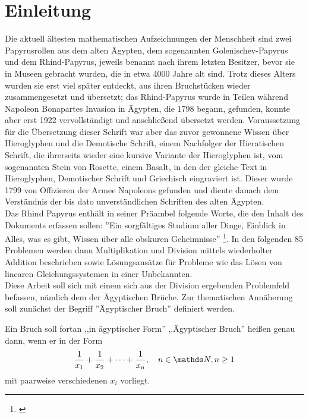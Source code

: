 \section{Einleitung}\label{sec:arithmetic}
Die aktuell ältesten mathematischen Aufzeichnungen der Menschheit sind zwei Papyrusrollen aus dem alten Ägypten, dem sogenannten Golenischev-Papyrus und dem Rhind-Papyrus, jeweils benannt nach ihrem letzten Besitzer, bevor sie in Museen gebracht wurden, die in etwa 4000 Jahre alt sind. Trotz dieses Alters wurden sie erst viel später entdeckt, aus ihren Bruchstücken wieder zusammengesetzt und übersetzt; das Rhind-Papyrus wurde in Teilen während Napoleon Bonapartes Invasion in Ägypten, die 1798 begann, gefunden, konnte aber erst 1922 vervollständigt und anschließend übersetzt werden. Voraussetzung für die Übersetzung dieser Schrift war aber das zuvor gewonnene Wissen über Hieroglyphen und die Demotische Schrift, einem Nachfolger der Hieratischen Schrift, die ihrerseits wieder eine kursive Variante der Hieroglyphen ist, vom sogenannten Stein von Rosette, einem Basalt, in den der gleiche Text in Hieroglyphen, Demotischer Schrift und Griechisch eingraviert ist. Dieser wurde 1799 von Offizieren der Armee Napoleons gefunden und diente danach dem Verständnis der bis dato unverständlichen Schriften des alten Ägypten.\cite[S.33 ff]{Burton2011}\\
Das Rhind Papyrus enthält in seiner Präambel folgende Worte, die den Inhalt des Dokuments erfassen sollen: ''Ein sorgfältiges Studium aller Dinge, Einblick in Alles, was es gibt, Wissen über alle obskuren Geheimnisse'' \footnote{\cite[S. 37, Übersetzung durch den Autor]{Burton2011}}. In den folgenden 85 Problemen werden dann Multiplikation und Division mittels wiederholter Addition beschrieben sowie Lösungsansätze für Probleme wie das Lösen von linearen Gleichungssystemen in einer Unbekannten.\\
Diese Arbeit soll sich mit einem sich aus der Division ergebenden Problemfeld befassen, nämlich dem der Ägyptischen Brüche. Zur thematischen Annäherung soll zunächst der Begriff ''Ägyptischer Bruch'' definiert werden.
\begin{def1}\label{def:egypfrac}
	Ein Bruch soll fortan ,,in ägyptischer Form'' \bzw\xspace,,Ägyptischer Bruch'' heißen genau dann, wenn er in der Form
	$$\uf{x_1} + \uf{x_2} + \cdots + \uf{x_n}, \quad n \in \N, n \ge 1$$
	mit paarweise verschiedenen $x_i$ vorliegt.
\end{def1}

